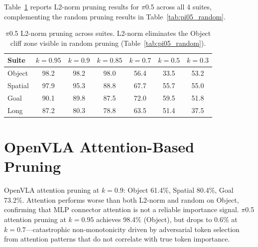 \documentclass[10pt,twocolumn]{article}
\begin{document}
Table~\ref{tab:pi05_l2norm} reports L2-norm pruning results for $\pi$0.5 across all 4 suites, complementing the random pruning results in Table~\ref{tab:pi05_random}.

\begin{table}[t]
\centering
\caption{$\pi$0.5 L2-norm pruning across suites. L2-norm eliminates the Object cliff zone visible in random pruning (Table~\ref{tab:pi05_random}).}
\label{tab:pi05_l2norm}
\small
\begin{tabular}{@{}lcccccc@{}}
\toprule
Suite & $k\!=\!0.95$ & $k\!=\!0.9$ & $k\!=\!0.85$ & $k\!=\!0.7$ & $k\!=\!0.5$ & $k\!=\!0.3$ \\
\midrule
Object & 98.2 & 98.2 & 98.0 & 56.4 & 33.5 & 53.2 \\
Spatial & 97.9 & 95.3 & 88.8 & 67.7 & 55.7 & 55.0 \\
Goal & 90.1 & 89.8 & 87.5 & 72.0 & 59.5 & 51.8 \\
Long & 87.2 & 80.3 & 78.8 & 63.5 & 51.4 & 37.5 \\
\bottomrule
\end{tabular}
\end{table}

\section{OpenVLA Attention-Based Pruning}
\label{app:openvla_attn}

OpenVLA attention pruning at $k\!=\!0.9$: Object 61.4\%, Spatial 80.4\%, Goal 73.2\%.
Attention performs worse than both L2-norm and random on Object, confirming that MLP connector attention is not a reliable importance signal.
$\pi$0.5 attention pruning at $k\!=\!0.95$ achieves 98.4\% (Object), but drops to 0.6\% at $k\!=\!0.7$---catastrophic non-monotonicity driven by adversarial token selection from attention patterns that do not correlate with true token importance.
\end{document}
